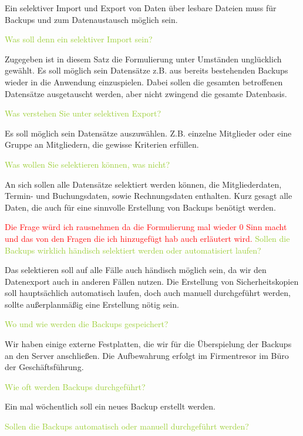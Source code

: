Ein selektiver Import und Export von Daten über lesbare Dateien muss für Backups und zum Datenaustausch möglich sein. 

\textcolor{YellowGreen}{Was soll denn ein selektiver Import sein?}

\textcolor{NavyBlue}{Zugegeben ist in diesem Satz die Formulierung unter Umständen unglücklich gewählt. Es soll möglich sein Datensätze z.B. aus bereits bestehenden Backups wieder in die Anwendung einzuspielen. Dabei sollen die gesamten betroffenen Datensätze ausgetauscht werden, aber nicht zwingend die gesamte Datenbasis.}

\textcolor{YellowGreen}{Was verstehen Sie unter selektiven Export?}

\textcolor{NavyBlue}{Es soll möglich sein Datensätze auszuwählen. Z.B. einzelne Mitglieder oder eine Gruppe an Mitgliedern, die gewisse Kriterien erfüllen.}

\textcolor{YellowGreen}{Was wollen Sie selektieren können, was nicht?}

\textcolor{NavyBlue}{An sich sollen alle Datensätze selektiert werden können, die Mitgliederdaten, Termin- und Buchungsdaten, sowie Rechnungsdaten enthalten. Kurz gesagt alle Daten, die auch für eine sinnvolle Erstellung von Backups benötigt werden. }

\textcolor{Red}{Die Frage würd ich rausnehmen da die Formulierung mal wieder 0 Sinn macht und das von den Fragen die ich hinzugefügt hab auch erläutert wird.}
\textcolor{YellowGreen}{Sollen die Backups wirklich händisch selektiert werden oder automatisiert laufen?}

\textcolor{NavyBlue}{Das selektieren soll auf alle Fälle auch händisch möglich sein, da wir den Datenexport auch in anderen Fällen nutzen. Die Erstellung von Sicherheitskopien soll hauptsächlich automatisch laufen, doch auch manuell durchgeführt werden, sollte außerplanmäßig eine Erstellung nötig sein.}

\textcolor{YellowGreen}{Wo und wie werden die Backups gespeichert?}

\textcolor{NavyBlue}{Wir haben einige externe Festplatten, die wir für die Überspielung der Backups an den Server anschließen. Die Aufbewahrung erfolgt im Firmentresor im Büro der Geschäftsführung. }

\textcolor{YellowGreen}{Wie oft werden Backups durchgeführt?}

\textcolor{NavyBlue}{Ein mal wöchentlich soll ein neues Backup erstellt werden.}

\textcolor{YellowGreen}{Sollen die Backups automatisch oder manuell durchgeführt werden?}

